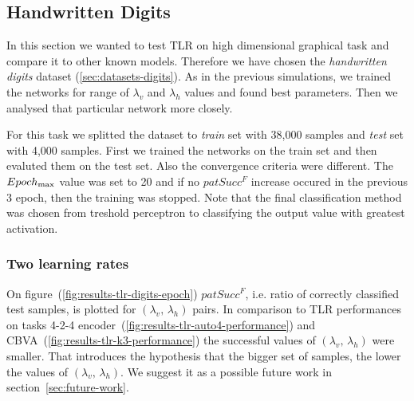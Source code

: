 

\subsection{Handwritten Digits} 
\label{sec:results-digits} 

In this section we wanted to test TLR on high dimensional graphical task and compare it to other known models. Therefore we have chosen the \emph{handwritten digits} dataset (\ref{sec:datasets-digits}). As in the previous simulations, we trained the networks for range of $\lambda_v$ and $\lambda_h$ values and found best parameters. Then we analysed that particular network more closely. 

For this task we splitted the dataset to \emph{train} set with 38,000 samples and \emph{test} set with 4,000 samples. First we trained the networks on the train set and then evaluted them on the test set. Also the convergence criteria were different. The $Epoch_{\rm max}$ value was set to 20 and if no $patSucc^F$ increase occured in the previous 3 epoch, then the training was stopped. Note that the final classification method was chosen from treshold perceptron to classifying the output value with greatest activation. 

\subsubsection{Two learning rates} 
\label{sec:tlr-digits} 
On figure~(\ref{fig:results-tlr-digits-epoch}) $patSucc^F$, i.e. ratio of correctly classified test samples, is plotted for $(\lambda_v,\, \lambda_h)$ pairs. In comparison to TLR performances on tasks 4-2-4 encoder~(\ref{fig:results-tlr-auto4-performance}) and CBVA~(\ref{fig:results-tlr-k3-performance}) the successful values of $(\lambda_v,\, \lambda_h)$ were smaller. That introduces the hypothesis that the bigger set of samples, the lower the values of $(\lambda_v,\, \lambda_h)$. We suggest it as a possible future work in section~\ref{sec:future-work}. 

